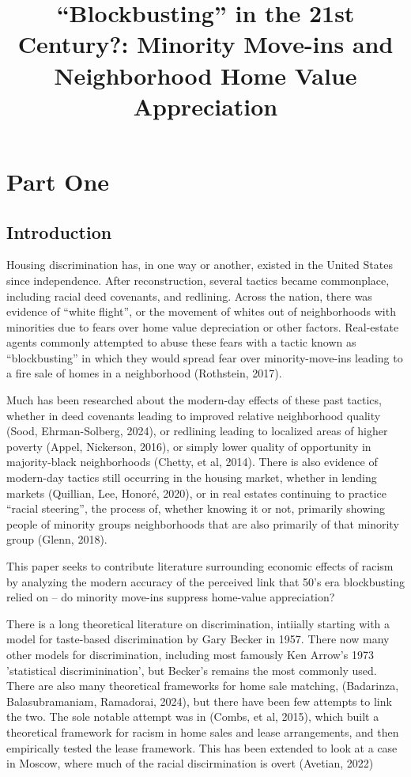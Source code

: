 \documentclass[11pt]{article}
\title{``Blockbusting'' in the 21st Century?: Minority Move-ins and
    Neighborhood Home Value
    Appreciation}
\begin{document}
    
    \maketitle
    
    

    
   
    \section{Part One}\label{part-one}

    \subsection{Introduction}\label{introduction}

    Housing discrimination has, in one way or another, existed in the United
States since independence. After reconstruction, several tactics became
commonplace, including racial deed covenants, and redlining. Across the
nation, there was evidence of ``white flight'', or the movement of
whites out of neighborhoods with minorities due to fears over home value
depreciation or other factors. Real-estate agents commonly attempted to
abuse these fears with a tactic known as ``blockbusting'' in which they
would spread fear over minority-move-ins leading to a fire sale of homes
in a neighborhood (Rothstein, 2017).

Much has been researched about the modern-day effects of these past
tactics, whether in deed covenants leading to improved relative
neighborhood quality (Sood, Ehrman-Solberg, 2024), or redlining leading
to localized areas of higher poverty (Appel, Nickerson, 2016), or simply
lower quality of opportunity in majority-black neighborhoods (Chetty, et
al, 2014). There is also evidence of modern-day tactics still occurring
in the housing market, whether in lending markets (Quillian, Lee,
Honoré, 2020), or in real estates continuing to practice ``racial
steering'', the process of, whether knowing it or not, primarily showing
people of minority groups neighborhoods that are also primarily of that
minority group (Glenn, 2018). 

This paper seeks to contribute literature surrounding economic effects of racism 
by analyzing the modern accuracy of the perceived link that 50's era blockbusting relied
on -- do minority move-ins suppress home-value appreciation?

There is a long theoretical literature on discrimination, intiially starting with a model for taste-based discrimination by Gary Becker in 1957. There now many other models for discrimination, including most famously Ken Arrow's 1973 'statistical discriminination', but Becker's remains the most commonly used. There are also many theoretical frameworks for home sale matching, (Badarinza, Balasubramaniam, Ramadorai, 2024), but there have been few attempts to link the two. The sole notable attempt was in (Combs, et al, 2015), which built a theoretical framework for racism in home sales and lease arrangements, and then empirically tested the lease framework. This has been extended to look at a case in Moscow, where much of the racial discirmination is overt (Avetian, 2022)
\end{document}
